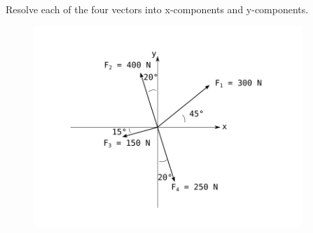 
Resolve each of the four vectors into x-components and y-components.

\begin{figure}[ht!]
  \centering
  \includegraphics[height=3in]{fig.png}
\end{figure}

